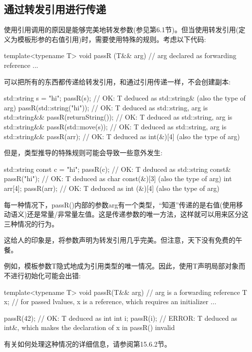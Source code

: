 \subsection{通过转发引用进行传递}

使用引用调用的原因是能够完美地转发参数(参见第6.1节)。但当使用转发引用(定义为模板形参的右值引用)时，需要使用特殊的规则。考虑以下代码:

\begin{cpp}
template<typename T>
void passR (T&& arg) { // arg declared as forwarding reference
	...
}
\end{cpp}

可以把所有的东西都传递给转发引用，和通过引用传递一样，不会创建副本:

\begin{cpp}
std::string s = "hi";
passR(s); // OK: T deduced as std::string& (also the type of arg)
passR(std::string("hi")); // OK: T deduced as std::string, arg is std::string&&
passR(returnString()); // OK: T deduced as std::string, arg is std::string&&
passR(std::move(s)); // OK: T deduced as std::string, arg is std::string&&
passR(arr); // OK: T deduced as int(&)[4] (also the type of arg)
\end{cpp}

但是，类型推导的特殊规则可能会导致一些意外发生:

\begin{cpp}
std::string const c = "hi";
passR(c); // OK: T deduced as std::string const&
passR("hi"); // OK: T deduced as char const(&)[3] (also the type of arg)
int arr[4];
passR(arr); // OK: T deduced as int (&)[4] (also the type of arg)
\end{cpp}

每一种情况下，passR()内部的参数arg有一个类型，“知道”传递的是右值(使用移动语义)还是常量/非常量左值。这是传递参数的唯一方法，这样就可以用来区分这三种情况的行为。

这给人的印象是，将参数声明为转发引用几乎完美。但注意，天下没有免费的午餐。

例如，模板参数T隐式地成为引用类型的唯一情况。因此，使用T声明局部对象而不进行初始化可能会出错:

\begin{cpp}
template<typename T>
void passR(T&& arg) { // arg is a forwarding reference
	T x; // for passed lvalues, x is a reference, which requires an initializer
	...
}

passR(42); // OK: T deduced as int
int i;
passR(i); // ERROR: T deduced as int&, which makes the declaration of x in passR() invalid
\end{cpp}

有关如何处理这种情况的详细信息，请参阅第15.6.2节。




















